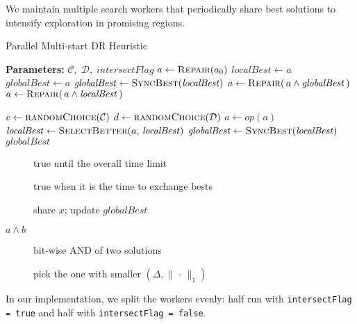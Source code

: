\documentclass{article}
\begin{document}
We maintain multiple search workers that periodically share best solutions to intensify exploration in promising regions.

\begin{algorithm}[H]
  \caption{Parallel Multi‐start DR Heuristic}
  \label{alg:msdr}
  \begin{algorithmic}[1]
      \State \textbf{Parameters:} $\mathcal C,\;\mathcal D,\;\textit{intersectFlag}$
      \State $a \gets \Call{Repair}{a_0}$
      \State $ \mathit{localBest} \gets a$
      \State $ \mathit{globalBest} \gets a$  
          \State $\mathit{globalBest} \gets \Call{SyncBest}{\mathit{localBest}}$
            \State $a \gets \Call{Repair}{\,a \land \mathit{globalBest}\,}$
           \Else
            \State $a \gets \Call{Repair}{\,a \land \mathit{localBest}\,}$
          \EndIf
        \EndIf

        \State $c \gets \Call{randomChoice}{\mathcal C}$   
        \State $d \gets \Call{randomChoice}{\mathcal D}$   
          \State $a \gets op(a)$
          \State $\mathit{localBest} \gets \Call{SelectBetter}{a,\,\mathit{localBest}}$
        \EndFor
      \EndWhile
      \State $\mathit{globalBest} \gets \Call{SyncBest}{\mathit{localBest}}$
      \State \Return $\mathit{globalBest}$
    \EndFunction
  \end{algorithmic}
\end{algorithm}

\begin{description}
  \item[] true until the overall time limit  
  \item[] true when it is the time to exchange bests  
  \item[] share $x$; update $\mathit{globalBest}$
  \item[$a\land b$] bit‐wise AND of two solutions  
  \item[] pick the one with smaller $(\Delta,\|\,\cdot\,\|_1)$
\end{description}

In our implementation, we split the workers evenly: half run with \texttt{intersectFlag = true} and half with \texttt{intersectFlag = false}.
\end{document}
